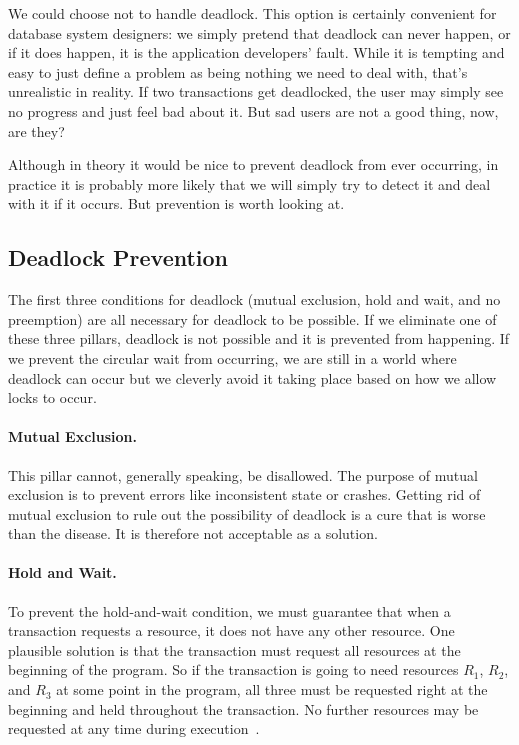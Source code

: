 \documentclass[a4paper]{report}
\begin{document}
We could choose not to handle deadlock. This option is certainly convenient for database system designers: we simply pretend that deadlock can never happen, or if it does happen, it is the application developers' fault. While it is tempting and easy to just define a problem as being nothing we need to deal with, that's unrealistic in reality. If two transactions get deadlocked, the user may simply see no progress and just feel bad about it. But sad users are not a good thing, now, are they?

Although in theory it would be nice to prevent deadlock from ever occurring, in practice it is probably more likely that we will simply try to detect it and deal with it if it occurs. But prevention is worth looking at.

\subsection*{Deadlock Prevention}

 The first three conditions for deadlock (mutual exclusion, hold and wait, and no preemption) are all necessary for deadlock to be possible. If we eliminate one of these three pillars, deadlock is not possible and it is prevented from happening. If we prevent the circular wait from occurring, we are still in a world where deadlock can occur but we cleverly avoid it taking place based on how we allow locks to occur.

\paragraph{Mutual Exclusion.} This pillar cannot, generally speaking, be disallowed. The purpose of  mutual exclusion is to prevent errors like inconsistent state or crashes. Getting rid of mutual exclusion to rule out the possibility of deadlock is a cure that is worse than the disease. It is therefore not acceptable as a solution.

\paragraph{Hold and Wait.} To prevent the hold-and-wait condition, we must guarantee that when a transaction requests a resource, it does not have any other resource. One plausible solution is that the transaction must request all resources at the beginning of the program. So if the transaction is going to need resources $R_{1}$, $R_{2}$, and $R_{3}$ at some point in the program, all three must be requested right at the beginning and held throughout the transaction. No further resources may be requested at any time during execution~\cite{osc}.
\end{document}
